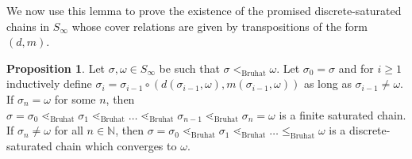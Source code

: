 \documentclass[oneside,11pt,reqno]{amsart}
\newcommand{\nn}{\ensuremath{\mathbb{N}}}
\theoremstyle{definition}
\newtheorem{proof techniques}{Proof Techniques}
\newtheorem{proposition}{Proposition}
\begin{document}
We now use this lemma to prove the existence of the promised discrete-saturated chains in $S_\infty$ whose cover relations are given by transpositions of the form $(d , m)$. 

\begin{proposition}\label{prop: existence of a discrete-saturated chain}
    Let $\sigma , \omega \in S_\infty$ be such that $\sigma <_\text{Bruhat} \omega$. Let $\sigma_0 = \sigma$ and for $i \geq 1$ inductively define $\sigma_i = \sigma_{i - 1} \circ (d(\sigma_{i  - 1} , \omega) , m(\sigma_{i - 1} , \omega))$ as long as $\sigma_{i - 1} \neq \omega$. If $\sigma_n = \omega$ for some $n$, then $\sigma  = \sigma_0 \lessdot_\text{Bruhat} \sigma_1 \lessdot_\text{Bruhat} \ldots \lessdot_\text{Bruhat} \sigma_{n - 1} \lessdot_\text{Bruhat} \sigma_n = \omega$ is a finite saturated chain. If $\sigma_n \neq \omega$ for all $n \in \nn$, then $\sigma  = \sigma_0 \lessdot_\text{Bruhat} \sigma_1 \lessdot_\text{Bruhat} \ldots \leq_\text{Bruhat} \omega$ is a discrete-saturated chain which converges to $\omega$.
\end{proposition}
\end{document}
